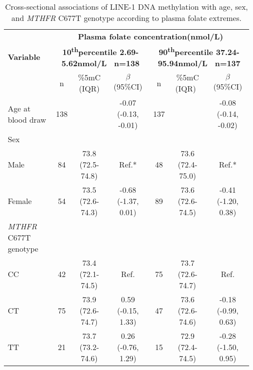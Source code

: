 \begin{flushleft}
\begin{table}
\caption{Cross-sectional associations of LINE-1 DNA methylation with age, sex, and \emph{MTHFR} C677T genotype according to plasma folate extremes.}\label{table3_2}\tablehead{}
\begin{adjustbox}{width=\textwidth}
\renewcommand{\arraystretch}{1.6}
\begin{tabular}{lcccccc}
\hline 
~ &\multicolumn{6}{c}{\centering \textbf{Plasma folate concentration(nmol/L)}}\\
\bfseries Variable 
&\multicolumn{3}{c}{\parbox[t]{3cm}{\centering \textbf{ 10\textsuperscript{th}percentile 2.69-5.62nmol/L \ n=138\\}}} 
&\multicolumn{3}{c}{\parbox[t]{3cm}{\centering \textbf{ 90\textsuperscript{th}percentile 37.24-95.94nmol/L \ n=137\\}}}\\
~ & n & \%5mC (IQR) & $\beta $ (95\%CI) & n &{ \%5mC (IQR)}~ & $\beta $ (95\%CI)\\
\hline
 Age at blood draw & 138 &~ & {}-0.07 (-0.13, -0.01) & 137 &~ & {}-0.08 (-0.14, -0.02)\\
 Sex &~ &~ &~ &~ &~ &~\\ \quad Male & 84 & 73.8 (72.5-74.8) & Ref.* & 48 & 73.6 (72.4-75.0) & Ref.*\\ \quad Female & 54 & 73.5 (72.6-74.3) & {}-0.68 (-1.37, 0.01) & 89 & 73.6 (72.6-74.5) & {}-0.41 (-1.20, 0.38)\\
 {\textit{MTHFR}}{ C677T genotype}&~ &~ &~ &~ &~ &~\\ \quad CC & 42 & 73.4 (72.1-74.5) & Ref. & 75 & 73.7 (72.6-74.7) & Ref.\\ \quad CT & 75 & 73.9 (72.6-74.7) & 0.59 (-0.15, 1.33) & 47 & 73.6 (72.6-74.6) & {}-0.18 (-0.99, 0.63)\\ \quad TT & 21 & 73.7 (73.2-74.6) & 0.26 (-0.76, 1.29) & 15 & 72.9 (72.4-74.5) & {}-0.28 (-1.50, 0.95)\\
 \hline 
\end{tabular}
\end{adjustbox}
\end{table}
\end{flushleft}



